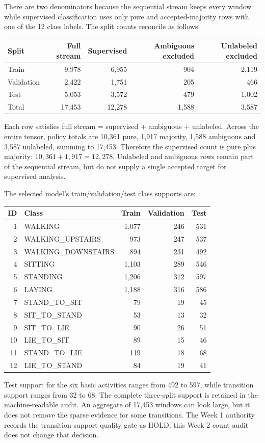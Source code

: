 \documentclass[11pt,a4paper]{article}
\begin{document}
There are two denominators because the sequential stream keeps every window while supervised classification uses only pure and accepted-majority rows with one of the 12 class labels. The split counts reconcile as follows.
\begin{center}\begin{tabular}{@{}lrrrr@{}}\toprule
Split & Full stream & Supervised & Ambiguous excluded & Unlabeled excluded\\\midrule
Train & 9,978 & 6,955 & 904 & 2,119\\
Validation & 2,422 & 1,751 & 205 & 466\\
Test & 5,053 & 3,572 & 479 & 1,002\\\midrule
Total & 17,453 & 12,278 & 1,588 & 3,587\\\bottomrule
\end{tabular}\end{center}
Each row satisfies full stream = supervised + ambiguous + unlabeled. Across the entire tensor, policy totals are 10,361 pure, 1,917 majority, 1,588 ambiguous and 3,587 unlabeled, summing to 17,453. Therefore the supervised count is pure plus majority: $10,361+1,917=12,278$. Unlabeled and ambiguous rows remain part of the sequential stream, but do not supply a single accepted target for supervised analysis.

The selected model's train/validation/test class supports are:
\begin{center}\small\begin{tabular}{@{}rP{4.6cm}rrr@{}}\toprule ID & Class & Train & Validation & Test\\ & WALKING & 1,077 & 246 & 531\\
2 & WALKING\_UPSTAIRS & 973 & 247 & 537\\
3 & WALKING\_DOWNSTAIRS & 894 & 231 & 492\\
4 & SITTING & 1,103 & 289 & 546\\
5 & STANDING & 1,206 & 312 & 597\\
6 & LAYING & 1,188 & 316 & 586\\
7 & STAND\_TO\_SIT & 79 & 19 & 45\\
8 & SIT\_TO\_STAND & 53 & 13 & 32\\
9 & SIT\_TO\_LIE & 90 & 26 & 51\\
10 & LIE\_TO\_SIT & 89 & 15 & 46\\
11 & STAND\_TO\_LIE & 119 & 18 & 68\\
12 & LIE\_TO\_STAND & 84 & 19 & 41\\\bottomrule\end{tabular}\end{center}
Test support for the six basic activities ranges from 492 to 597, while transition support ranges from 32 to 68. The complete three-split support is retained in the machine-readable audit. An aggregate of 17,453 windows can look large, but it does not remove the sparse evidence for some transitions. The Week 1 authority records the transition-support quality gate as HOLD; this Week 2 count audit does not change that decision.
\end{document}
